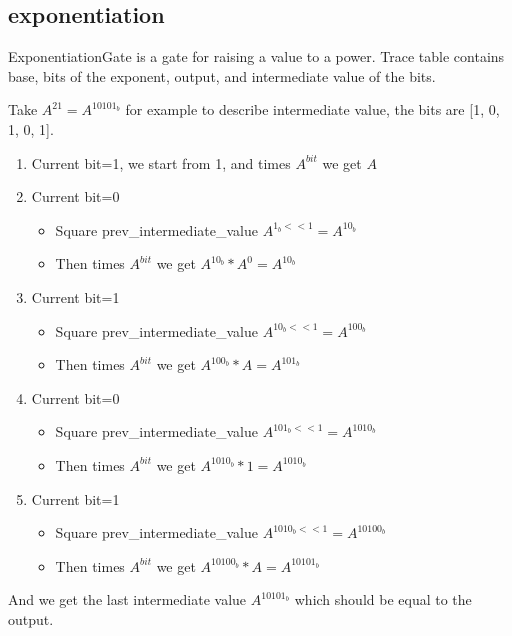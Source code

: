 \subsection{exponentiation}

ExponentiationGate is a gate for raising a value to a power. Trace table contains base, bits of the exponent, output, and intermediate value of the bits.

Take $A^{21} = A^{10101_b}$ for example to describe intermediate value, the bits are [1, 0, 1, 0, 1].

\begin{enumerate}
    \item Current bit=1, we start from 1, and times $A^{bit}$ we get $A$
    \item Current bit=0
    \begin{itemize}
        \item Square prev\_intermediate\_value $A^{1_b << 1} = A^{10_b}$
        \item Then times $A^{bit}$ we get $A^{10_b} * A^0 = A^{10_b}$
    \end{itemize}
    \item Current bit=1
    \begin{itemize}
        \item Square prev\_intermediate\_value $A^{10_b<<1} = A^{100_b}$
        \item Then times $A^{bit}$ we get $A^{100_b} * A = A^{101_b}$
    \end{itemize}
    \item Current bit=0
    \begin{itemize}
        \item Square prev\_intermediate\_value $A^{101_b << 1} = A^{1010_b}$
        \item Then times $A^{bit}$ we get $A^{1010_b} * 1 = A^{1010_b}$
    \end{itemize}
    \item Current bit=1
    \begin{itemize}
        \item Square prev\_intermediate\_value $A^{1010_b << 1} = A^{10100_b}$
        \item Then times $A^{bit}$ we get $A^{10100_b} * A = A^{10101_b}$
    \end{itemize}
\end{enumerate}

And we get the last intermediate value $A^{10101_b}$ which should be equal to the output.

